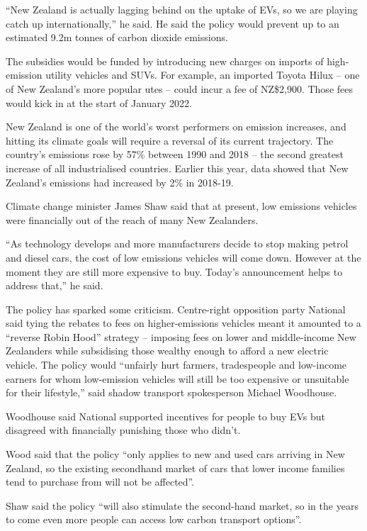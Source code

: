 \documentclass[a4paper,12pt]{article}
\begin{document}
“New Zealand is actually lagging behind on the uptake of EVs, so we are playing catch up internationally,” he said. He said the policy would prevent up to an estimated 9.2m tonnes of carbon dioxide emissions.

The subsidies would be funded by introducing new charges on imports of high-emission utility vehicles and SUVs. For example, an imported Toyota Hilux – one of New Zealand’s more popular utes – could incur a fee of NZ\$2,900. Those fees would kick in at the start of January 2022.

New Zealand is one of the world’s worst performers on emission increases, and hitting its climate goals will require a reversal of its current trajectory. The country’s emissions rose by 57\% between 1990 and 2018 – the second greatest increase of all industrialised countries. Earlier this year, data showed that New Zealand’s emissions had increased by 2\% in 2018-19.

Climate change minister James Shaw said that at present, low emissions vehicles were financially out of the reach of many New Zealanders.

“As technology develops and more manufacturers decide to stop making petrol and diesel cars, the cost of low emissions vehicles will come down. However at the moment they are still more expensive to buy. Today’s announcement helps to address that,” he said.

The policy has sparked some criticism. Centre-right opposition party National said tying the rebates to fees on higher-emissions vehicles meant it amounted to a “reverse Robin Hood” strategy – imposing fees on lower and middle-income New Zealanders while subsidising those wealthy enough to afford a new electric vehicle. The policy would “unfairly hurt farmers, tradespeople and low-income earners for whom low-emission vehicles will still be too expensive or unsuitable for their lifestyle,” said shadow transport spokesperson Michael Woodhouse.

Woodhouse said National supported incentives for people to buy EVs but disagreed with financially punishing those who didn’t.

Wood said that the policy “only applies to new and used cars arriving in New Zealand, so the existing secondhand market of cars that lower income families tend to purchase from will not be affected”.

Shaw said the policy “will also stimulate the second-hand market, so in the years to come even more people can access low carbon transport options”.
\end{document}
